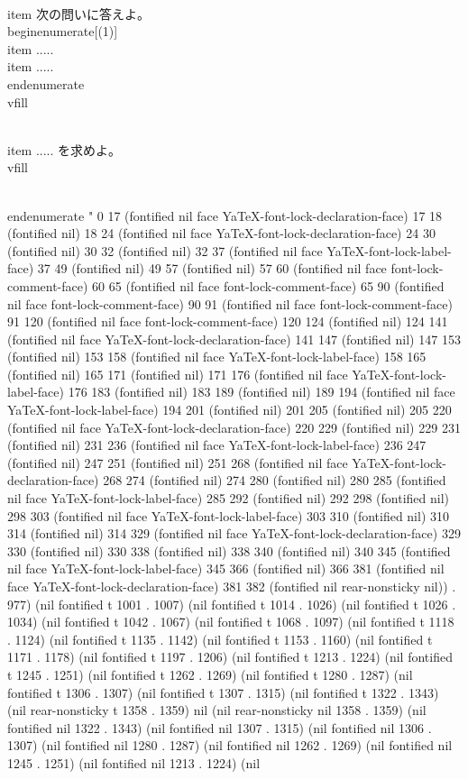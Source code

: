 {  \\item 次の問いに答えよ。
    \\begin{enumerate}[(1)]
      \\item .....
      \\item .....
    \\end{enumerate}
\\vfill

  \\item ..... を求めよ。
\\vfill

\\end{enumerate}
" 0 17 (fontified nil face YaTeX-font-lock-declaration-face) 17 18 (fontified nil) 18 24 (fontified nil face YaTeX-font-lock-declaration-face) 24 30 (fontified nil) 30 32 (fontified nil) 32 37 (fontified nil face YaTeX-font-lock-label-face) 37 49 (fontified nil) 49 57 (fontified nil) 57 60 (fontified nil face font-lock-comment-face) 60 65 (fontified nil face font-lock-comment-face) 65 90 (fontified nil face font-lock-comment-face) 90 91 (fontified nil face font-lock-comment-face) 91 120 (fontified nil face font-lock-comment-face) 120 124 (fontified nil) 124 141 (fontified nil face YaTeX-font-lock-declaration-face) 141 147 (fontified nil) 147 153 (fontified nil) 153 158 (fontified nil face YaTeX-font-lock-label-face) 158 165 (fontified nil) 165 171 (fontified nil) 171 176 (fontified nil face YaTeX-font-lock-label-face) 176 183 (fontified nil) 183 189 (fontified nil) 189 194 (fontified nil face YaTeX-font-lock-label-face) 194 201 (fontified nil) 201 205 (fontified nil) 205 220 (fontified nil face YaTeX-font-lock-declaration-face) 220 229 (fontified nil) 229 231 (fontified nil) 231 236 (fontified nil face YaTeX-font-lock-label-face) 236 247 (fontified nil) 247 251 (fontified nil) 251 268 (fontified nil face YaTeX-font-lock-declaration-face) 268 274 (fontified nil) 274 280 (fontified nil) 280 285 (fontified nil face YaTeX-font-lock-label-face) 285 292 (fontified nil) 292 298 (fontified nil) 298 303 (fontified nil face YaTeX-font-lock-label-face) 303 310 (fontified nil) 310 314 (fontified nil) 314 329 (fontified nil face YaTeX-font-lock-declaration-face) 329 330 (fontified nil) 330 338 (fontified nil) 338 340 (fontified nil) 340 345 (fontified nil face YaTeX-font-lock-label-face) 345 366 (fontified nil) 366 381 (fontified nil face YaTeX-font-lock-declaration-face) 381 382 (fontified nil rear-nonsticky nil)) . 977) (nil fontified t 1001 . 1007) (nil fontified t 1014 . 1026) (nil fontified t 1026 . 1034) (nil fontified t 1042 . 1067) (nil fontified t 1068 . 1097) (nil fontified t 1118 . 1124) (nil fontified t 1135 . 1142) (nil fontified t 1153 . 1160) (nil fontified t 1171 . 1178) (nil fontified t 1197 . 1206) (nil fontified t 1213 . 1224) (nil fontified t 1245 . 1251) (nil fontified t 1262 . 1269) (nil fontified t 1280 . 1287) (nil fontified t 1306 . 1307) (nil fontified t 1307 . 1315) (nil fontified t 1322 . 1343) (nil rear-nonsticky t 1358 . 1359) nil (nil rear-nonsticky nil 1358 . 1359) (nil fontified nil 1322 . 1343) (nil fontified nil 1307 . 1315) (nil fontified nil 1306 . 1307) (nil fontified nil 1280 . 1287) (nil fontified nil 1262 . 1269) (nil fontified nil 1245 . 1251) (nil fontified nil 1213 . 1224) (nil }

